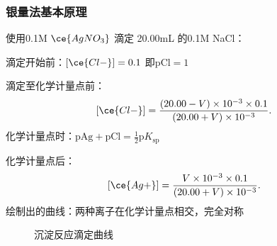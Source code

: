 \subsubsection*{银量法基本原理}%
\label{subsub:银量法基本原理}
\begin{eg}
    使用0.1M $\ce{AgNO_3}$ 滴定 20.00mL 的0.1M NaCl：

    滴定开始前：$[\ce{Cl-}]=0.1$ 即$\text{pCl}=1$ 

    滴定至化学计量点前：\[
        [\ce{Cl-}]=\frac{\left( 20.00-V \right)\times 10^{-3}\times 0.1}{\left( 20.00+V \right)\times 10^{-3}}
    .\] 
    化学计量点时：$\text{pAg}+\text{pCl}=\frac{1}{2}\text{p}K_\text{sp}$

    化学计量点后： \[
        [\ce{Ag+}]=\frac{V\times 10^{-3}\times 0.1}{\left( 20.00+V \right)\times 10^{-3}}
    .\]
    绘制出的曲线：两种离子在化学计量点相交，完全对称
\begin{figure}[ht]
    \centering
    \caption{沉淀反应滴定曲线}
    \label{fig:沉淀反应滴定曲线}
\end{figure}
\end{eg}

